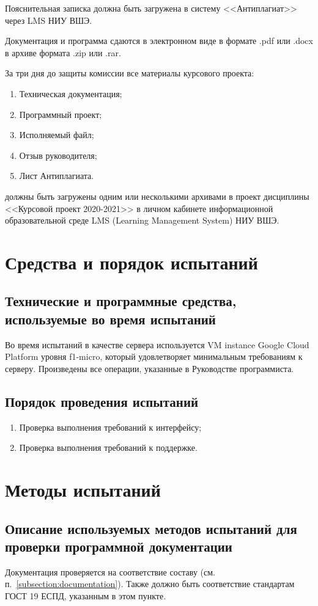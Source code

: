 \documentclass[testmethods]{espd}
\begin{document}
Пояснительная записка должна быть загружена в систему <<Антиплагиат>> через LMS НИУ ВШЭ.

Документация и программа сдаются в электронном виде в формате .pdf или .docx в архиве формата .zip или .rar.

За три дня до защиты комиссии все материалы курсового проекта:
\begin{enumerate}
\item Техническая документация;
\item Программный проект;
\item Исполняемый файл;
\item Отзыв руководителя;
\item Лист Антиплагиата.
\end{enumerate}
должны быть загружены одним или несколькими архивами в проект дисциплины <<Курсовой проект 2020-2021>> в личном кабинете информационной образовательной среде LMS (Learning Management System) НИУ ВШЭ.

\section{Средства и порядок испытаний}
\subsection{Технические и программные средства, используемые во время испытаний}
Во время испытаний в качестве сервера используется VM instance Google Cloud Platform уровня f1-micro, который удовлетворяет минимальным требованиям к серверу. Произведены все операции, указанные в Руководстве программиста.

\subsection{Порядок проведения испытаний}
\begin{enumerate}
\item Проверка выполнения требований к интерфейсу;
\item Проверка выполнения требований к поддержке.
\end{enumerate}

\section{Методы испытаний}
\subsection{Описание используемых методов испытаний для проверки программной документации}
Документация проверяется на соответствие составу (см. п.~\ref{subsection:documentation}). Также должно быть соответствие стандартам ГОСТ 19 ЕСПД, указанным в этом пункте.
\end{document}
